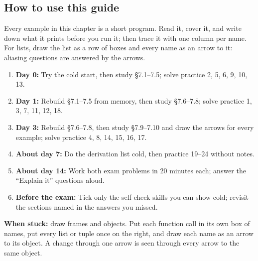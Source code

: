 \documentclass[11pt]{article}
\begin{document}
\begin{keepsection}
\section{How to use this guide}

Every example in this chapter is a short program. Read it, cover it, and write down what it prints before you run it; then trace it with one column per name. For lists, draw the list as a row of boxes and every name as an arrow to it: aliasing questions are answered by the arrows.

\begin{enumerate}
\item \textbf{Day 0:} Try the cold start, then study §7.1–7.5; solve practice 2, 5, 6, 9, 10, 13.
\item \textbf{Day 1:} Rebuild §7.1–7.5 from memory, then study §7.6–7.8; solve practice 1, 3, 7, 11, 12, 18.
\item \textbf{Day 3:} Rebuild §7.6–7.8, then study §7.9–7.10 and draw the arrows for every example; solve practice 4, 8, 14, 15, 16, 17.
\item \textbf{About day 7:} Do the derivation list cold, then practice 19–24 without notes.
\item \textbf{About day 14:} Work both exam problems in 20 minutes each; answer the “Explain it” questions aloud.
\item \textbf{Before the exam:} Tick only the self-check skills you can show cold; revisit the sections named in the answers you missed.
\end{enumerate}

\begin{notebox}\textbf{When stuck:} draw frames and objects. Put each function call in its own box of names, put every list or tuple once on the right, and draw each name as an arrow to its object. A change through one arrow is seen through every arrow to the same object.\end{notebox}
\end{keepsection}
\end{document}

